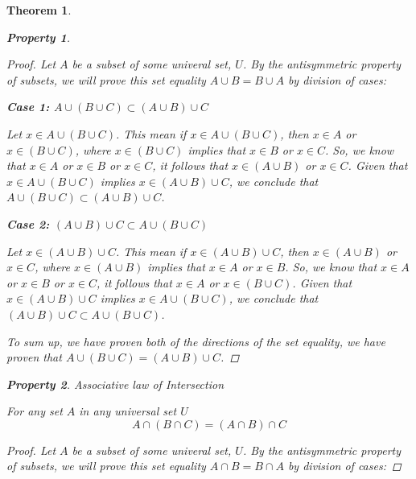 \documentclass{book}
\newtheorem{theorem}{Theorem}[section]
\newtheorem{property}{Property}[theorem]
\theoremstyle{definition}
\theoremstyle{remark}
\begin{document}
\begin{theorem}
\begin{property}
        \begin{proof}
            Let $A$ be a subset of some univeral set, $U$. By the antisymmetric property of subsets, we will prove this set equality $A \cup B = B \cup A$ by division of cases:
            
            \begin{flushleft} \textbf{Case 1: $A \cup (B \cup C) \subset (A \cup B) \cup C$} \end{flushleft}
                Let $x \in A \cup (B \cup C)$. This mean if $x \in A \cup (B \cup C)$, then $x \in A$ or $x \in (B \cup C)$, where $x \in (B \cup C)$ implies that $x \in B$ or $x \in C$. So, we know that $x \in A$ or $x \in B$ or $x \in C$, it follows that $x \in (A \cup B)$ or $x \in C$. Given that $x \in A \cup (B \cup C)$ implies $x \in (A \cup B) \cup C$, we conclude that $A \cup (B \cup C) \subset (A \cup B) \cup C$.      
            
            \begin{flushleft} \textbf{Case 2: $(A \cup B) \cup C \subset A \cup (B \cup C)$} \end{flushleft} 
                Let $x \in (A \cup B) \cup C$. This mean if $x \in (A \cup B) \cup C$, then $x \in (A \cup B)$ or $x \in C$, where $x \in (A \cup B)$ implies that $x \in A$ or $x \in B$. So, we know that $x \in A$ or $x \in B$ or $x \in C$, it follows that $x \in A$ or $x \in (B \cup C)$. Given that $x \in (A \cup B) \cup C$ implies $x \in A \cup (B \cup C)$, we conclude that $(A \cup B) \cup C \subset A \cup (B \cup C)$. 
            
            To sum up, we have proven both of the directions of the set equality, we have proven that $A \cup (B \cup C) = (A \cup B) \cup C$. 
        \end{proof}
    \end{property}
    
    
    \newpage
    \begin{property}
    Associative law of Intersection \\
        \begin{tcolorbox}
            For any set $A$ in any universal set $U$
                \begin{equation*}
                    A \cap (B \cap C) = (A \cap B) \cap C
                \end{equation*}
        \end{tcolorbox}
    
        \begin{proof}
            Let $A$ be a subset of some univeral set, $U$. By the antisymmetric property of subsets, we will prove this set equality $A \cap B = B \cap A$ by division of cases:
            

\end{proof}
\end{property}
\end{theorem}
\end{document}
